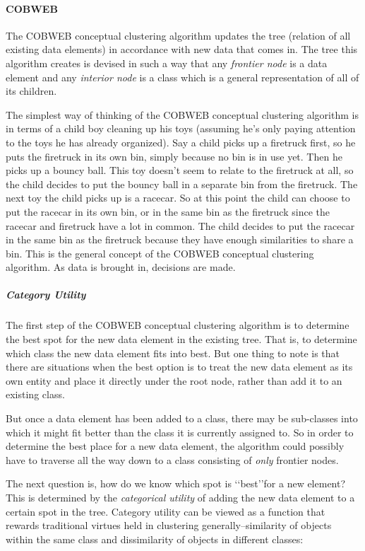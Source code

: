 \paragraph {COBWEB}
The COBWEB conceptual clustering algorithm\cite{fisher1987knowledge} updates the tree (relation of all existing data elements) in accordance with new data that comes in. The tree this algorithm creates is devised in such a way that any \emph{frontier node} is a data element and any \emph{interior node} is a class which is a general representation of all of its children.

The simplest way of thinking of the COBWEB conceptual clustering algorithm is in terms of a child boy cleaning up his toys (assuming he's only paying attention to the toys he has already organized). Say a child picks up a firetruck first, so he puts the firetruck in its own bin, simply because no bin is in use yet. Then he picks up a bouncy ball. This toy doesn't seem to relate to the firetruck at all, so the child decides to put the bouncy ball in a separate bin from the firetruck. The next toy the child picks up is a racecar. So at this point the child can choose to put the racecar in its own bin, or in the same bin as the firetruck since the racecar and firetruck have a lot in common. The child decides to put the racecar in the same bin as the firetruck because they have enough similarities to share a bin. This is the general concept of the COBWEB conceptual clustering algorithm. As data is brought in, decisions are made.

\subparagraph {Category Utility}
The first step of the COBWEB conceptual clustering algorithm is to determine the best spot for the new data element in the existing tree. That is, to determine which class the new data element fits into best. But one thing to note is that there are situations when the best option is to treat the new data element as its own entity and place it directly under the root node, rather than add it to an existing class.

But once a data element has been added to a class, there may be sub-classes into which it might fit better than the class it is currently assigned to. So in order to determine the best place for a new data element, the algorithm could possibly have to traverse all the way down to a class consisting of \emph{only} frontier nodes.

The next question is, how do we know which spot is \lq\lq{best}\rq\rq for a new element? This is determined by the \emph{categorical utility}\cite{gluck1985information} of adding the new data element to a certain spot in the tree. Category utility can be viewed as a function that rewards traditional virtues held in clustering generally--similarity of objects within the same class and dissimilarity of objects in different classes\cite{fisher1987knowledge}:

